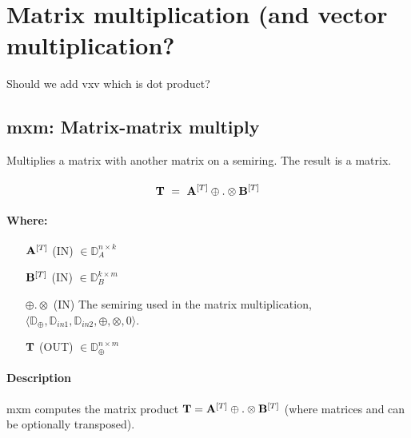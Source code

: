 \section{Matrix multiplication (and vector multiplication?}

Should we add vxv which is dot product?

\subsection{{\sf mxm}: Matrix-matrix multiply}

Multiplies a matrix with another matrix on a semiring. The result is a matrix.

\paragraph{\syntax}

$$
{\bf T} ~ = ~ {\bf A}^{[T]} \oplus.\otimes {\bf B}^{[T]}
$$

\paragraph{Where:}

\begin{itemize}[leftmargin=0.7in]
    \item[${\bf A}^{[T]}$]    ({\sf IN}) $\in \mathbb{D}_A^{n\times k}$

    \item[${\bf B}^{[T]}$]    ({\sf IN}) $\in \mathbb{D}_B^{k\times m}$

    \item[$\oplus.\otimes$]   ({\sf IN}) The semiring used in the matrix
    multiplication, $\langle \mathbb{D}_\oplus, \mathbb{D}_{in1},\mathbb{D}_{in2},\oplus,\otimes,0 \rangle$.

    \item[${\bf T}$]    ({\sf OUT}) $\in \mathbb{D}_\oplus^{n\times m}$
    
\end{itemize}


\paragraph{Description}

{\sf mxm} computes the matrix product 
${\bf T} = {\bf A}^{[T]} \oplus . \otimes {\bf B}^{[T]}$
(where matrices  and  can be optionally transposed).  

